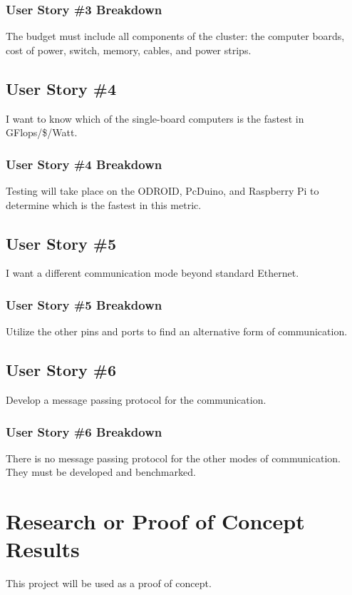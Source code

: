 \subsubsection{User Story \#3 Breakdown}
The budget must include all components of the cluster: the computer boards, cost of power, switch, memory, cables, and power strips.

\subsection{User Story \#4}
I want to know which of the single-board computers is the fastest in GFlops/\$/Watt.
\subsubsection{User Story \#4 Breakdown}
Testing will take place on the ODROID, PcDuino, and Raspberry Pi to determine which is the fastest in this metric. 

\subsection{User Story \#5} 
I want a different communication mode beyond standard Ethernet.
\subsubsection{User Story \#5 Breakdown}
Utilize the other pins and ports to find an alternative form of communication.

\subsection{User Story \#6} 
Develop a message passing protocol for the communication.
\subsubsection{User Story \#6 Breakdown}
There is no message passing protocol for the other modes of communication. They must be developed and benchmarked.

\section{Research or Proof of Concept Results}
This project will be used as a proof of concept.
